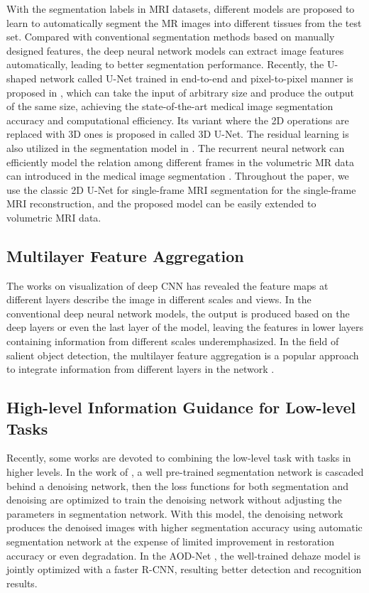 \documentclass[runningheads]{llncs}
\begin{document}
With the segmentation labels in MRI datasets, different models are proposed to learn to automatically segment the MR images into different tissues from the test set. Compared with conventional segmentation methods based on manually designed features, the deep neural network models can extract image features automatically, leading to better segmentation performance. Recently, the U-shaped network called U-Net trained in end-to-end and pixel-to-pixel manner is proposed in \cite{18}, which can take the input of arbitrary size and produce the output of the same size, achieving the state-of-the-art medical image segmentation accuracy and computational efficiency. Its variant where the 2D operations are replaced with 3D ones is proposed in \cite{19} called 3D U-Net. The residual learning is also utilized in the segmentation model in \cite{20}. The recurrent neural network can efficiently model the relation among different frames in the volumetric MR data can introduced in the medical image segmentation \cite{21,22}. Throughout the paper, we use the classic 2D U-Net for single-frame MRI segmentation for the single-frame MRI reconstruction, and the proposed model can be easily extended to volumetric MRI data.

\subsection{Multilayer Feature Aggregation}
\label{MLFA}

The works \cite{23} on visualization of deep CNN has revealed the feature maps at different layers describe the image in different scales and views. In the conventional deep neural network models, the output is produced based on the deep layers or even the last layer of the model, leaving the features in lower layers containing information from different scales underemphasized. In the field of salient object detection, the multilayer feature aggregation is a popular approach to integrate information from different layers in the network \cite{24,25,26}.

\subsection{High-level Information Guidance for Low-level Tasks}
\label{CAM}

Recently, some works are devoted to combining the low-level task with tasks in higher levels. In the work of \cite{27}, a well pre-trained segmentation network is cascaded behind a denoising network, then the loss functions for both segmentation and denoising are optimized to train the denoising network without adjusting the parameters in segmentation network. With this model, the denoising network produces the denoised images with higher segmentation accuracy using automatic segmentation network at the expense of limited improvement in restoration accuracy or even degradation. In the AOD-Net \cite{28}, the well-trained dehaze model is jointly optimized with a faster R-CNN, resulting better detection and recognition results.
\end{document}
